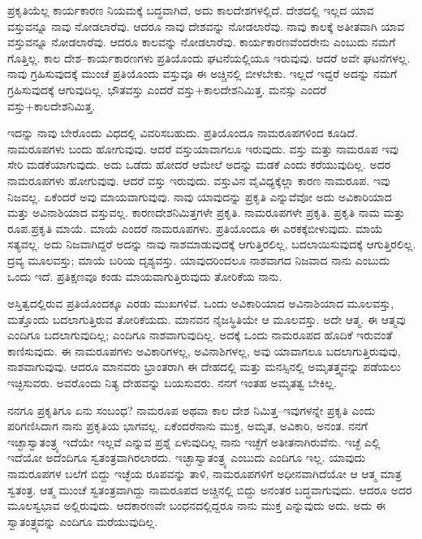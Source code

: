 ಪ್ರಕೃತಿಯೆಲ್ಲ ಕಾರ್ಯಕಾರಣ ನಿಯಮಕ್ಕೆ ಬದ್ಧವಾಗಿದೆ, ಅದು ಕಾಲದೇಶಗಳಲ್ಲಿದೆ. ದೇಶದಲ್ಲಿ ಇಲ್ಲದ ಯಾವ ವಸ್ತುವನ್ನೂ ನಾವು ನೋಡಲಾರೆವು. ಆದರೂ ನಾವು ದೇಶವನ್ನು ನೋಡಲಾರೆವು. ನಾವು ಕಾಲಕ್ಕೆ ಅತೀತವಾಗಿ ಯಾವ ವಸ್ತುವನ್ನೂ ನೋಡಲಾರೆವು. ಆದರೂ ಕಾಲವನ್ನು ನೋಡಲಾರೆವು. ಕಾರ್ಯಕಾರಣವೆಂದರೇನು ಎಂಬುದು ನಮಗೆ ಗೊತ್ತಿಲ್ಲ. ಕಾಲ ದೇಶ–ಕಾರ್ಯಕಾರಣಗಳು ಪ್ರತಿಯೊಂದು ಘಟನೆಯಲ್ಲಿಯೂ ಇರುವುವು. ಆದರೆ ಅವೇ ಘಟನೆಗಳಲ್ಲ. ನಾವು ಗ್ರಹಿಸುವುದಕ್ಕೆ ಮುಂಚೆ ಪ್ರತಿಯೊಂದು ವಸ್ತುವೂ ಈ ಅಚ್ಚಿನಲ್ಲಿ ಬೀಳಬೇಕು. ಇಲ್ಲದೆ ಇದ್ದರೆ ಅದನ್ನು ನಮಗೆ ಗ್ರಹಿಸುವುದಕ್ಕೆ ಆಗುವುದಿಲ್ಲ. ಭೌತವಸ್ತು ಎಂದರೆ ವಸ್ತು+ಕಾಲದೇಶನಿಮಿತ್ತ. ಮನಸ್ಸು ಎಂದರೆ ವಸ್ತು+ಕಾಲದೇಶನಿಮಿತ್ತ.

ಇದನ್ನು ನಾವು ಬೇರೊಂದು ವಿಧದಲ್ಲಿ ವಿವರಿಸಬಹುದು. ಪ್ರತಿಯೊಂದೂ ನಾಮರೂಪಗಳಿಂದ ಕೂಡಿದೆ. ನಾಮರೂಪಗಳು ಬಂದು ಹೋಗುವುವು. ಆದರೆ ವಸ್ತು\break ಯಾವಾಗಲೂ ಇರುವುದು. ವಸ್ತು ಮತ್ತು ನಾಮರೂಪ ಇವು ಸೇರಿ ಮಡಕೆಯಾಗುವುದು. ಅದು ಒಡೆದು ಹೋದರೆ ಆಮೇಲೆ ಅದನ್ನು ಮಡಕೆ ಎಂದು ಕರೆಯುವುದಿಲ್ಲ. ಅದರ ನಾಮರೂಪಗಳು ಹೋಗುವುವು. ಆದರೆ ವಸ್ತು ಇರುವುದು. ವಸ್ತುವಿನ ವೈವಿಧ್ಯಕ್ಕೆಲ್ಲಾ ಕಾರಣ ನಾಮರೂಪ. ಇವು ನಿಜವಲ್ಲ. ಏಕೆಂದರೆ ಅವು ಮಾಯವಾಗುವುವು. ನಾವು ಯಾವುದನ್ನು ಪ್ರಕೃತಿ ಎನ್ನುವೆವೋ ಅದು ಅವಿಕಾರಿಯಾದ ಮತ್ತು ಅವಿನಾಶಿಯಾದ ವಸ್ತುವಲ್ಲ. ಕಾರಣದೇಶನಿಮಿತ್ತಗಳೇ ಪ್ರಕೃತಿ. ನಾಮರೂಪಗಳೇ ಪ್ರಕೃತಿ. ಪ್ರಕೃತಿ ನಾಮ ಮತ್ತು ರೂಪ.\break ಪ್ರಕೃತಿ ಮಾಯೆ. ಮಾಯೆ ಎಂದರೆ ನಾಮರೂಪಗಳು. ಪ್ರತಿಯೊಂದೂ ಈ ಎರಕಕ್ಕೆ\break ಬೀಳುವುದು. ಮಾಯೆ ಸತ್ಯವಲ್ಲ. ಅದು ನಿಜವಾಗಿದ್ದರೆ ಅದನ್ನು ನಾವು ನಾಶಮಾಡುವುದಕ್ಕೆ ಆಗುತ್ತಿರಲಿಲ್ಲ, ಬದಲಾಯಿಸುವುದಕ್ಕೆ ಆಗುತ್ತಿರಲಿಲ್ಲ. ದ್ರವ್ಯ ಮೂಲವಸ್ತು; ಮಾಯೆ ಬರಿಯ ದೃಶ್ಯವಸ್ತು. ಯಾವುದರಿಂದಲೂ ನಾಶವಾಗದ ನಿಜವಾದ ನಾನು ಎಂಬುದು ಒಂದು ಇದೆ. ಪ್ರತಿಕ್ಷಣವೂ ಕಂಡು ಮಾಯವಾಗುತ್ತಿರುವುದು ತೋರಿಕೆಯ ನಾನು.

ಅಸ್ತಿತ್ವದಲ್ಲಿರುವ ಪ್ರತಿಯೊಂದಕ್ಕೂ ಎರಡು ಮುಖಗಳಿವೆ. ಒಂದು ಅವಿಕಾರಿಯಾದ ಅವಿನಾಶಿಯಾದ ಮೂಲವಸ್ತು, ಮತ್ತೊಂದು ಬದಲಾಗುತ್ತಿರುವ ತೋರಿಕೆಯದು. ಮಾನ\-ವನ ನೈಜಸ್ಥಿತಿಯೇ ಆ ಮೂಲವಸ್ತು. ಅದೇ ಆತ್ಮ. ಈ ಆತ್ಮವು ಎಂದಿಗೂ ಬದಲಾಗುವುದಿಲ್ಲ; ಎಂದಿಗೂ ನಾಶವಾಗುವುದಿಲ್ಲ. ಅದಕ್ಕೆ ಒಂದು ನಾಮರೂಪದ ಹೊದಿಕೆ ಇರುವಂತೆ ಕಾಣಿಸುವುದು. ಈ ನಾಮರೂಪಗಳು ಅವಿಕಾರಿಗಳಲ್ಲ, ಅವಿನಾಶಿಗಳಲ್ಲ, ಅವು ಯಾವಾಗಲೂ ಬದಲಾಗುತ್ತಿರುವುವು, ನಾಶವಾಗುವುವು. ಆದರೂ ಮಾನವರು ಭ್ರಾಂತರಾಗಿ ಈ ದೇಹದಲ್ಲಿ ಮತ್ತು ಮನಸ್ಸಿನಲ್ಲಿ ಅಮೃತತ್ತ್ವವನ್ನು ಪಡೆಯಲು ಇಚ್ಛಿಸುವರು. ಅವರೊಂದು ನಿತ್ಯ ದೇಹವನ್ನು ಬಯಸುವರು. ನನಗೆ ಇಂತಹ ಅಮೃತತ್ವ ಬೇಕಿಲ್ಲ.

ನನಗೂ ಪ್ರಕೃತಿಗೂ ಏನು ಸಂಬಂಧ? ನಾಮರೂಪ ಅಥವಾ ಕಾಲ ದೇಶ ನಿಮಿತ್ತ–ಇವುಗಳನ್ನೇ ಪ್ರಕೃತಿ ಎಂದು ಪರಿಗಣಿಸಿದಾಗ ನಾನು ಪ್ರಕೃತಿಯ ಭಾಗವಲ್ಲ. ಏಕೆಂದರೆ\break ನಾನು ಮುಕ್ತ, ಅಮೃತ, ಅವಿಕಾರಿ, ಅನಂತ. ನನಗೆ ಇಚ್ಛಾಸ್ವಾತಂತ್ರ್ಯ ಇದೆಯೇ ಇಲ್ಲವೆ ಎನ್ನುವ ಪ್ರಶ್ನೆ ಏಳುವುದಿಲ್ಲ ನಾನು ಇಚ್ಛೆಗೆ ಅತೀತನಾಗಿರುವೆನು. ಇಚ್ಛೆ ಎಲ್ಲಿ ಇದೆಯೋ ಅದೆಂದಿಗೂ ಸ್ವತಂತ್ರವಾಗಿರಲಾರದು. ಇಚ್ಛಾಸ್ವಾತಂತ್ರ್ಯ ಎಂಬುದು ಎಂದಿಗೂ ಇಲ್ಲ. ಯಾವುದು ನಾಮರೂಪಗಳ ಬಲೆಗೆ ಬಿದ್ದು ಇಚ್ಛೆಯ ರೂಪವನ್ನು ತಾಳಿ, ನಾಮರೂಪಗಳಿಗೆ ಅಧೀನವಾಗಿದೆಯೋ ಆ ಆತ್ಮ ಮಾತ್ರ ಸ್ವತಂತ್ರ. ಆತ್ಮ ಮುಂಚೆ ಸ್ವತಂತ್ರವಾಗಿದ್ದು ನಾಮರೂಪದ ಅಚ್ಚಿನಲ್ಲಿ ಬಿದ್ದು ಅನಂತರ ಬದ್ಧವಾಗುವುದು. ಆದರೂ ಅದರ ಮೂಲಸ್ವಭಾವ ಅಲ್ಲಿರುವುದು. ಆದಕಾರಣವೇ ಬಂಧನದಲ್ಲಿದ್ದರೂ ನಾನು ಮುಕ್ತ ಎನ್ನುವುದು ಅದು. ಅದು ಈ ಸ್ವಾತಂತ್ರ್ಯವನ್ನು ಎಂದಿಗೂ ಮರೆಯುವುದಿಲ್ಲ.

